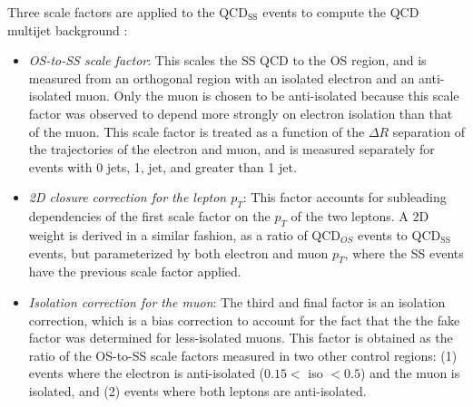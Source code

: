 Three scale factors are applied to the QCD$_{\text{SS}}$ events to compute the QCD multijet background \cite{CMS-HIG-17-024} \cite{CMS-HIG-22-007}:
\begin{itemize}
    \item \textit{OS-to-SS scale factor}: This scales the SS QCD to the OS region, and is measured from an orthogonal region with an isolated electron and an anti-isolated muon. Only the muon is chosen to be anti-isolated because this scale factor was observed to depend more strongly on electron isolation than that of the muon. This scale factor is treated as a function of the $\Delta R$ separation of the trajectories of the electron and muon, and is measured separately for events with 0 jets, 1, jet, and greater than 1 jet.
    \item \textit{2D closure correction for the lepton $p_{T}$}: This factor accounts for subleading dependencies of the first scale factor on the $p_{T}$ of the two leptons. A 2D weight is derived in a similar fashion, as a ratio of QCD$_{OS}$ events to QCD$_{\text{SS}}$ events, but parameterized by both electron and muon $p_{T}$, where the SS events have the previous scale factor applied.
    \item \textit{Isolation correction for the muon}: The third and final factor is an isolation correction, which is a bias correction to account for the fact that the the fake factor was determined for less-isolated muons. This factor is obtained as the ratio of the OS-to-SS scale factors measured in two other control regions: (1) events where the electron is anti-isolated ($0.15 <$ iso $< 0.5$) and the muon is isolated, and (2) events where both leptons are anti-isolated. 
\end{itemize}